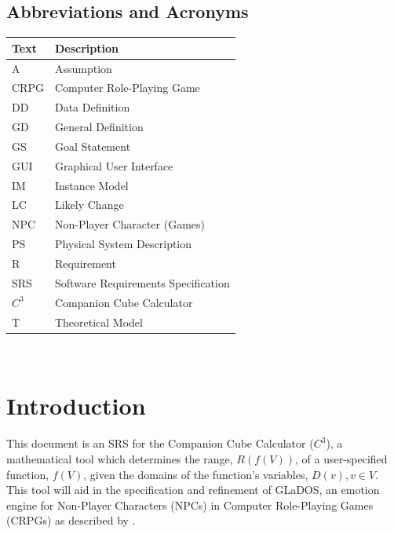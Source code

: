 \documentclass[12pt]{article}
\newcommand{\progname}{Companion Cube Calculator} %
\newcommand{\prognameAbbrv}{$C^{3}$}
\begin{document}

\subsection{Abbreviations and Acronyms}

\renewcommand{\arraystretch}{1.2}
\begin{tabular}{l l} 
  \toprule		
  \textbf{Text} & \textbf{Description}\\
  \midrule 
  A & Assumption\\
  CRPG & Computer Role-Playing Game\\
  DD & Data Definition\\
  GD & General Definition\\
  GS & Goal Statement\\
  GUI & Graphical User Interface\\
  IM & Instance Model\\
  LC & Likely Change\\
  NPC & Non-Player Character (Games)\\
  PS & Physical System Description\\
  R & Requirement\\
  SRS & Software Requirements Specification\\
  \prognameAbbrv{} & \progname{}\\
  T & Theoretical Model\\
  \bottomrule
\end{tabular}

\newpage

\tableofcontents

~\newpage


\section{Introduction}
\label{intro}
This document is an SRS for the \progname{} (\prognameAbbrv{}), a mathematical 
tool which determines the range, $R(f(V))$, of a user-specified function, 
$f(V)$, given the domains of the function's variables, $D(v), v \in V$. This 
tool will aid in the specification and refinement of GLaDOS, an emotion engine 
for Non-Player Characters (NPCs) in Computer Role-Playing Games (CRPGs) as 
described by \citet{glados}.
\end{document}
